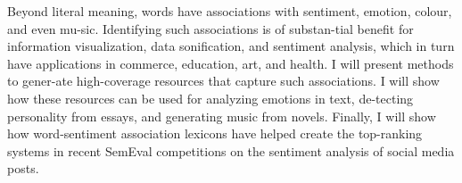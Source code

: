 Beyond literal meaning, words have associations with sentiment, emotion, colour, and even mu-sic. Identifying such associations is of substan-tial benefit for information visualization, data sonification, and sentiment analysis, which in turn have applications in commerce, education, art, and health. I will present methods to gener-ate high-coverage resources that capture such associations. I will show how these resources can be used for analyzing emotions in text, de-tecting personality from essays, and generating music from novels. Finally, I will show how word-sentiment association lexicons have helped create the top-ranking systems in recent SemEval competitions on the sentiment analysis of social media posts.
